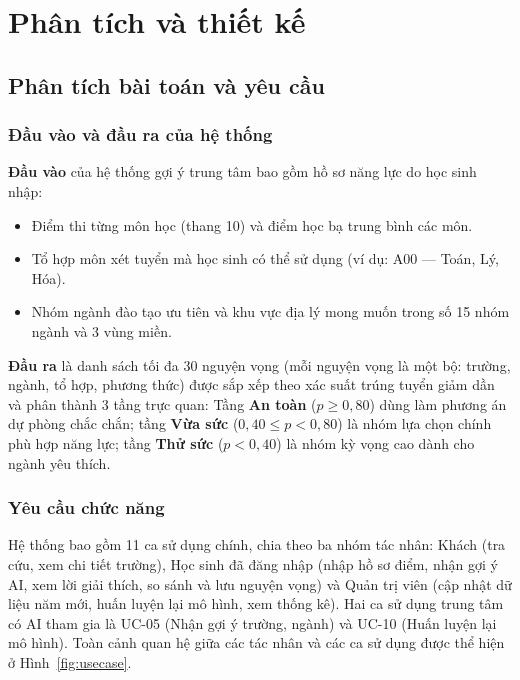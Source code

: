 \chapter{Phân tích và thiết kế}
\label{ch:thietke}

\section{Phân tích bài toán và yêu cầu}

\subsection{Đầu vào và đầu ra của hệ thống}

\textbf{Đầu vào} của hệ thống gợi ý trung tâm bao gồm hồ sơ năng lực do học sinh nhập:
\begin{itemize}[leftmargin=1.6em, itemsep=2pt]
  \item Điểm thi từng môn học (thang 10) và điểm học bạ trung bình các môn.
  \item Tổ hợp môn xét tuyển mà học sinh có thể sử dụng (ví dụ: A00 --- Toán, Lý, Hóa).
  \item Nhóm ngành đào tạo ưu tiên và khu vực địa lý mong muốn trong số 15 nhóm ngành và 3 vùng miền.
\end{itemize}

\textbf{Đầu ra} là danh sách tối đa 30 nguyện vọng (mỗi nguyện vọng là một bộ: trường, ngành, tổ hợp, phương thức) được sắp xếp theo xác suất trúng tuyển giảm dần và phân thành 3 tầng trực quan: Tầng \textbf{An toàn} ($p \ge 0{,}80$) dùng làm phương án dự phòng chắc chắn; tầng \textbf{Vừa sức} ($0{,}40 \le p < 0{,}80$) là nhóm lựa chọn chính phù hợp năng lực; tầng \textbf{Thử sức} ($p < 0{,}40$) là nhóm kỳ vọng cao dành cho ngành yêu thích.

\subsection{Yêu cầu chức năng}

Hệ thống bao gồm 11 ca sử dụng  chính, chia theo ba nhóm tác nhân: Khách (tra cứu, xem chi tiết trường), Học sinh đã đăng nhập (nhập hồ sơ điểm, nhận gợi ý AI, xem lời giải thích, so sánh và lưu nguyện vọng) và Quản trị viên (cập nhật dữ liệu năm mới, huấn luyện lại mô hình, xem thống kê). Hai ca sử dụng trung tâm có AI tham gia là UC-05 (Nhận gợi ý trường, ngành) và UC-10 (Huấn luyện lại mô hình). Toàn cảnh quan hệ giữa các tác nhân và các ca sử dụng được thể hiện ở Hình~\ref{fig:usecase}.

